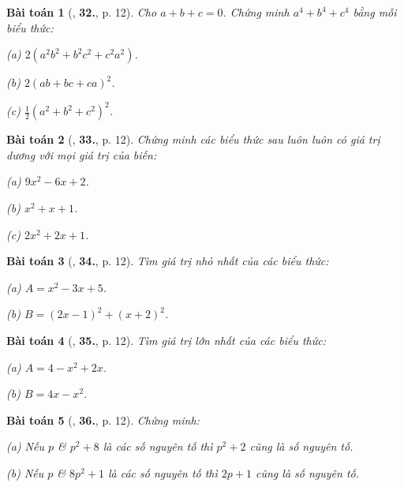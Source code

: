 \documentclass{article}
\numberwithin{equation}{section}
\newtheorem{baitoan}{Bài toán}[section]
\begin{document}
\begin{baitoan}[\cite{Binh_Toan_8_tap_1}, \textbf{32.}, p. 12]
	Cho $a + b + c = 0$. Chứng minh $a^4 + b^4 + c^4$ bằng mỗi biểu thức:
	\begin{enumerate*}
		\item[(a)] $2(a^2b^2 + b^2c^2 + c^2a^2)$.
		\item[(b)] $2(ab + bc + ca)^2$.
		\item[(c)] $\frac{1}{2}(a^2 + b^2 + c^2)^2$.
	\end{enumerate*}
\end{baitoan}

\begin{baitoan}[\cite{Binh_Toan_8_tap_1}, \textbf{33.}, p. 12]
	Chứng minh các biểu thức sau luôn luôn có giá trị dương với mọi giá trị của biến:
	\begin{enumerate*}
		\item[(a)] $9x^2 - 6x + 2$.
		\item[(b)] $x^2 + x + 1$.
		\item[(c)] $2x^2 + 2x + 1$.
	\end{enumerate*}
\end{baitoan}

\begin{baitoan}[\cite{Binh_Toan_8_tap_1}, \textbf{34.}, p. 12]
	Tìm giá trị nhỏ nhất của các biểu thức:
	\begin{enumerate*}
		\item[(a)] $A = x^2 - 3x + 5$.
		\item[(b)] $B = (2x - 1)^2 + (x + 2)^2$.
	\end{enumerate*}
\end{baitoan}

\begin{baitoan}[\cite{Binh_Toan_8_tap_1}, \textbf{35.}, p. 12]
	Tìm giá trị lớn nhất của các biểu thức:
	\begin{enumerate*}
		\item[(a)] $A = 4 - x^2 + 2x$.
		\item[(b)] $B = 4x - x^2$.
	\end{enumerate*}
\end{baitoan}

\begin{baitoan}[\cite{Binh_Toan_8_tap_1}, \textbf{36.}, p. 12]
	Chứng minh:
	\begin{enumerate*}
		\item[(a)] Nếu $p$ \& $p^2 + 8$ là các số nguyên tố thì $p^2 + 2$ cũng là số nguyên tố.
		\item[(b)] Nếu $p$ \& $8p^2 + 1$ là các số nguyên tố thì $2p + 1$ cũng là số nguyên tố.
	\end{enumerate*}
\end{baitoan}
\end{document}
